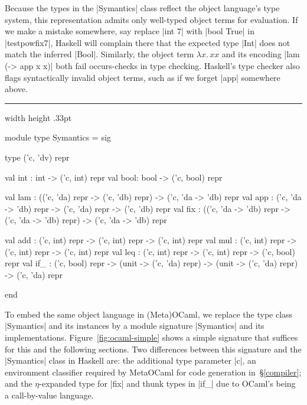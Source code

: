 \documentclass[preprint]{sigplanconf}
\newcommand{\fun}[1]{\mathopen{\lambda\mathord{#1}.\,}}
\newenvironment{floatrule}
    {\hrule width \hsize height .33pt \vspace{.5pc}}
    {\par\addvspace{1ex}}
\begin{document}
Because the types in the |Symantics| class reflect the object language's type
system, this representation admits only well-typed object terms for evaluation.
If we make a mistake somewhere, say replace |int 7| with |bool True| in
|testpowfix7|, Haskell will complain there that the expected type |Int| does not
match the inferred |Bool|.  Similarly, the object term $\fun{x}xx$ and its
encoding |lam (\x -> app x x)| both fail occurs-checks in type checking.
Haskell's type checker also flags syntactically invalid object terms, such as if
we forget |app| somewhere above.

\begin{figure*}
\begin{floatrule}
\begin{code}
module type Symantics = sig

  type ('c, 'dv) repr

  val int : int  -> ('c, int) repr
  val bool: bool -> ('c, bool) repr

  val lam : (('c, 'da) repr -> ('c, 'db) repr) -> ('c, 'da -> 'db) repr
  val app : ('c, 'da -> 'db) repr -> ('c, 'da) repr -> ('c, 'db) repr
  val fix : (('c, 'da -> 'db) repr -> ('c, 'da -> 'db) repr) -> ('c, 'da -> 'db) repr

  val add : ('c, int) repr -> ('c, int) repr -> ('c, int) repr
  val mul : ('c, int) repr -> ('c, int) repr -> ('c, int) repr
  val leq : ('c, int) repr -> ('c, int) repr -> ('c, bool) repr
  val if_ : ('c, bool) repr -> (unit -> ('c, 'da) repr) -> (unit -> ('c, 'da) repr) -> ('c, 'da) repr

end
\end{code}
\end{floatrule}
\caption{A simple (Meta)OCaml embedding of our object language}
\label{fig:ocaml-simple}
\end{figure*}

To embed the same object language in (Meta)OCaml, we replace the type
class |Symantics| and its instances by a module signature |Symantics|
and its implementations.  Figure~\ref{fig:ocaml-simple} shows a simple
signature that suffices for this and the following sections.
Two differences between this signature and the |Symantics| class in
Haskell are: the additional type parameter |c|, an
environment classifier \citep{WalidPOPL03} required by MetaOCaml for
code generation in~\S\ref{compiler}; and the $\eta$-expanded type for
|fix| and thunk types in |if_| due to OCaml's being a call-by-value
language.
\end{document}
